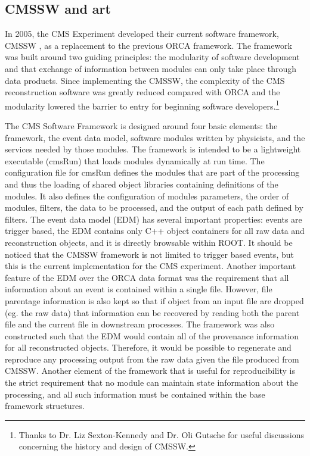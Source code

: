 \subsection{CMSSW and art}

In 2005, the CMS Experiment developed their current software framework, CMSSW \cite{cmssw}, as a replacement to the previous ORCA framework. The framework was built around two guiding principles: the modularity of software development and that exchange of information between modules can only take place through data products. Since implementing the CMSSW, the complexity of the CMS reconstruction software was greatly reduced compared with ORCA and the modularity lowered the barrier to entry for beginning software developers.\footnote{Thanks to Dr. Liz Sexton-Kennedy and Dr. Oli Gutsche for useful discussions concerning the history and design of CMSSW.}

The CMS Software Framework is designed around four basic elements: the framework, the event data model, software modules written by physicists, and the services needed by those modules\cite{cmssw_web}. The framework is intended to be a lightweight executable (cmsRun) that loads modules dynamically at run time. The configuration file for cmsRun defines the modules that are part of the processing and thus the loading of shared object libraries containing definitions of the modules. It also defines the configuration of modules parameters, the order of modules, filters, the data to be processed, and the output of each path defined by filters. The event data model (EDM) has several important properties: events are trigger based, the EDM contains only C++ object containers for all raw data and reconstruction objects, and it is directly browsable within ROOT. It should be noticed that the CMSSW framework is not limited to trigger based events, but this is the current implementation for the CMS experiment. Another important feature of the EDM over the ORCA data format was the requirement that all information about an event is contained within a single file. However, file parentage information is also kept so that if object from an input file are dropped (eg. the raw data) that information can be recovered by reading both the parent file and the current file in downstream processes. The framework was also constructed such that the EDM would contain all of the provenance information for all reconstructed objects. Therefore, it would be possible to regenerate and reproduce any processing output from the raw data given the file produced from CMSSW. Another element of the framework that is useful for reproducibility is the strict requirement that no module can maintain state information about the processing, and all such information must be contained within the base framework structures.

